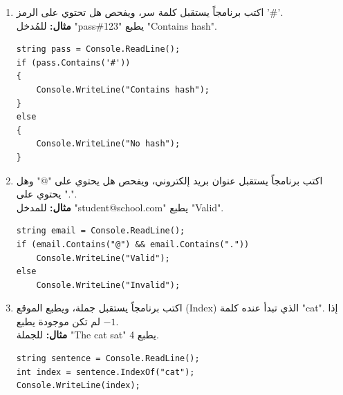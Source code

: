 \documentclass[14pt]{extarticle}
\begin{document}
\begin{enumerate}[itemsep=2em]
    \item
    اكتب برنامجاً يستقبل كلمة سر، ويفحص هل تحتوي على الرمز \textenglish{'\#'}. \\
    \textbf{مثال:} للمُدخل \textenglish{"pass\#123"} يطبع \textenglish{"Contains hash"}.
    \ifwithsols
    \begin{boxSolution}
    \begin{english}
    \begin{verbatim}
string pass = Console.ReadLine();
if (pass.Contains('#'))
{
    Console.WriteLine("Contains hash");
}
else
{
    Console.WriteLine("No hash");
}
    \end{verbatim}
    \end{english}
    \end{boxSolution}
    \fi

    \item
    اكتب برنامجاً يستقبل عنوان بريد إلكتروني، ويفحص هل يحتوي على \textenglish{"@"} وهل يحتوي على \textenglish{"."}. \\
    \textbf{مثال:} للمدخل \textenglish{"student@school.com"} يطبع \textenglish{"Valid"}.
    \ifwithsols
    \begin{boxSolution}
    \begin{english}
    \begin{verbatim}
string email = Console.ReadLine();
if (email.Contains("@") && email.Contains("."))
    Console.WriteLine("Valid");
else
    Console.WriteLine("Invalid");
    \end{verbatim}
    \end{english}
    \end{boxSolution}
    \clearpage
    \fi

    \item
    اكتب برنامجاً يستقبل جملة، ويطبع الموقع (Index) الذي تبدأ عنده كلمة \textenglish{"cat"}.
    إذا لم تكن موجودة يطبع $-1$. \\
    \textbf{مثال:} للجملة \textenglish{"The cat sat"} يطبع \textenglish{4}.
    \ifwithsols
    \begin{boxSolution}
    \begin{english}
    \begin{verbatim}
string sentence = Console.ReadLine();
int index = sentence.IndexOf("cat");
Console.WriteLine(index);
    \end{verbatim}
    \end{english}
    \end{boxSolution}
    \fi


\end{enumerate}
\end{document}
